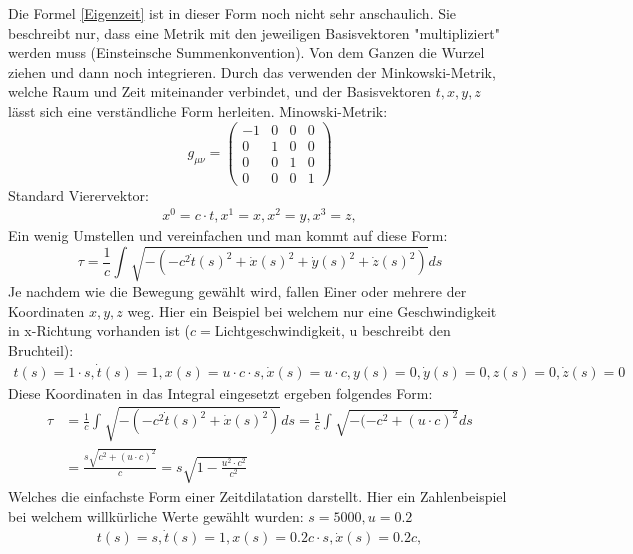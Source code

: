 \begin{refsection}
Die Formel \ref{Eigenzeit} ist in dieser Form noch nicht sehr anschaulich. Sie beschreibt nur, dass eine Metrik mit den jeweiligen Basisvektoren "multipliziert" werden muss (Einsteinsche Summenkonvention). Von dem Ganzen die Wurzel ziehen und dann noch integrieren.
Durch das verwenden der Minkowski-Metrik, welche Raum und Zeit miteinander verbindet, und der Basisvektoren $t, x, y, z$ l\"asst sich eine verst\"andliche Form herleiten. 
Minowski-Metrik:
\begin{equation}
    g_{\mu\nu}=
    \begin{pmatrix}
        -1 & 0 & 0 & 0 \\
        0 & 1 & 0 & 0 \\
        0 & 0 & 1 & 0 \\
        0 & 0 & 0 & 1
    \end{pmatrix}
\end{equation}
Standard Vierervektor:
\begin{align*}
    x^{0}=c \cdot t,
    x^{1}=x,
    x^{2}=y,
    x^{3}=z,
\end{align*}
Ein wenig Umstellen und vereinfachen und man kommt auf diese Form:
\begin{equation}
    \tau
    =
    \frac{1}{c}\int_{}^{}\sqrt{-(-c^2\dot{t}(s)^{2}+\dot{x}(s)^{2}+\dot{y}(s)^{2}+\dot{z}(s)^{2})}ds
\end{equation}
Je nachdem wie die Bewegung gew\"ahlt wird, fallen Einer oder mehrere der Koordinaten $x, y, z$ weg.
Hier ein Beispiel bei welchem nur eine Geschwindigkeit in x-Richtung vorhanden ist ($c=$Lichtgeschwindigkeit, u beschreibt den Bruchteil):
\begin{align*}
     t(s)=1\cdot s, \dot{t}(s)=1,
 	 x(s)=u\cdot c \cdot s, \dot{x}(s)=u\cdot c,
     y(s)=0, \dot{y}(s)=0,
     z(s)=0, \dot{z}(s)=0
\end{align*}
Diese Koordinaten in das Integral eingesetzt ergeben folgendes Form:
\begin{align*}
    \tau
    &=
    \frac{1}{c}\int_{}^{}\sqrt{-(-c^2\dot{t}(s)^2+\dot{x}(s)^2)}ds 
    =
    \frac{1}{c}\int_{}^{}\sqrt{-(-c^2 +(u\cdot c)^{2}}ds\\
    &=
    \frac{s\sqrt{c^2+(u\cdot c)^{2}}}{c} 
    =
    s\sqrt{1-\frac{u^2\cdot c^2}{c^2}}
\end{align*}
Welches die einfachste Form einer Zeitdilatation darstellt.
Hier ein Zahlenbeispiel bei welchem willkürliche Werte gew\"ahlt wurden:
$s=5000, u=0.2$ 
\begin{align*}
    t(s)=s, \dot{t}(s)=1,
    x(s)=0.2c \cdot s, \dot{x}(s)=0.2c,

\end{align*}
\end{refsection}
